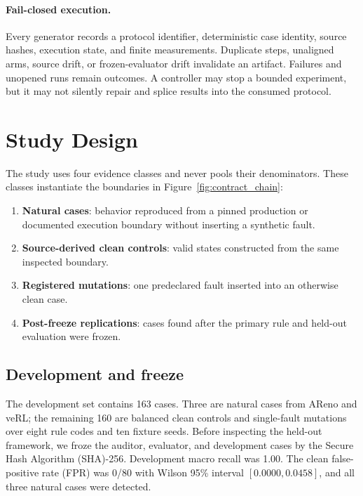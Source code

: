 \documentclass[10pt]{article}
\begin{document}
\paragraph{Fail-closed execution.}
Every generator records a protocol identifier, deterministic case identity,
source hashes, execution state, and finite measurements.  Duplicate steps,
unaligned arms, source drift, or frozen-evaluator drift invalidate an artifact.
Failures and unopened runs remain outcomes.  A controller may stop a bounded
experiment, but it may not silently repair and splice results into the consumed
protocol.

\section{Study Design}

The study uses four evidence classes and never pools their denominators.  These
classes instantiate the boundaries in Figure~\ref{fig:contract_chain}:

\begin{enumerate}
  \item \textbf{Natural cases}: behavior reproduced from a pinned production
  or documented execution boundary without inserting a synthetic fault.
  \item \textbf{Source-derived clean controls}: valid states constructed from
  the same inspected boundary.
  \item \textbf{Registered mutations}: one predeclared fault inserted into an
  otherwise clean case.
  \item \textbf{Post-freeze replications}: cases found after the primary rule
  and held-out evaluation were frozen.
\end{enumerate}

\subsection{Development and freeze}

The development set contains 163 cases.  Three are natural cases from AReno
and veRL; the remaining 160 are balanced clean controls and single-fault
mutations over eight rule codes and ten fixture seeds.  Before inspecting the
held-out framework, we froze the auditor, evaluator, and development cases by
the Secure Hash Algorithm (SHA)-256.  Development macro recall was 1.00.  The
clean false-positive rate (FPR) was 0/80 with Wilson
95\% interval $[0.0000,0.0458]$, and all three natural cases were detected.
\end{document}
